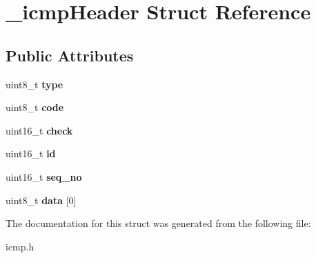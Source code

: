 \hypertarget{struct__icmpHeader}{}\section{\+\_\+icmp\+Header Struct Reference}
\label{struct__icmpHeader}
\subsection*{Public Attributes}
\begin{DoxyCompactItemize}
\item 
\mbox{\label{struct__icmpHeader_ac5cb21998813ca6fba404cd504fbada0}} 
uint8\+\_\+t {\bfseries type}
\item 
\mbox{\label{struct__icmpHeader_a143f787e775af41d31936c1ced3f569c}} 
uint8\+\_\+t {\bfseries code}
\item 
\mbox{\label{struct__icmpHeader_af2ca43ba9768757f4d04006a2d03fcc5}} 
uint16\+\_\+t {\bfseries check}
\item 
\mbox{\label{struct__icmpHeader_a3f07c14263b87401727edf31865bd15c}} 
uint16\+\_\+t {\bfseries id}
\item 
\mbox{\label{struct__icmpHeader_af8216680fadf3c4ae5f989de1d3babf0}} 
uint16\+\_\+t {\bfseries seq\+\_\+no}
\item 
\mbox{\label{struct__icmpHeader_a6e63c5802b87f37b0f686e16934048e5}} 
uint8\+\_\+t {\bfseries data} \mbox{[}0\mbox{]}
\end{DoxyCompactItemize}


The documentation for this struct was generated from the following file\+:\begin{DoxyCompactItemize}
\item 
icmp.\+h\end{DoxyCompactItemize}
